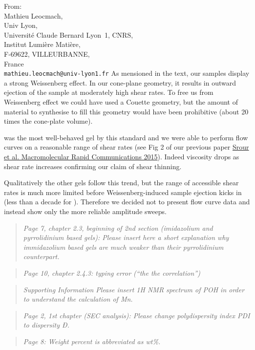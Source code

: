 \documentclass[a4paper, parskip=true, firsthead=false, fromemail=true, foldmarks=false]{scrlttr2}
\newenvironment{quotationi}
{\begin{quotation}\itshape}
{\end{quotation}}
\begin{document}
\begin{letter}{From:\\
Mathieu Leocmach,\\
Univ Lyon,\\ 
Universit\'e Claude Bernard Lyon~1, CNRS,\\
Institut Lumi\`ere Mati\`ere,\\
F-69622, VILLEURBANNE,\\
France\\
\texttt{mathieu.leocmach@univ-lyon1.fr}
}
As mensioned in the text, our samples display a strong Weissenberg effect. In our cone-plane geometry, it results in outward ejection of the sample at moderately high shear rates. To free us from Weissenberg effect we could have used a Couette geometry, but the amount of material to synthesise to fill this geometry would have been prohibitive (about 20 times the cone-plate volume).

 was the most well-behaved gel by this standard and we were able to perform flow curves on a reasonable range of shear rates (see Fig 2 of our previous paper \href{http://doi.org/10.1002/marc.201400478}{Srour et al. Macromolecular Rapid Communications 2015}). Indeed viscosity drops as shear rate increases confirming our claim of shear thinning.

Qualitatively the other gels follow this trend, but the range of accessible shear rates is much more limited before Weissenberg-induced sample ejection kicks in (less than a decade for ). Therefore we decided not to present flow curve data and instead show only the more reliable amplitude sweeps.



\begin{quotationi}
Page 7, chapter 2.3, beginning of 2nd section (imidazolium and pyrrolidinium based gels): Please insert here a short explanation why immidazolium based gels are much weaker than their pyrrolidinium counterpart.
\end{quotationi}

\begin{quotationi}
Page 10, chapter 2.4.3: typing error (“the the correlation”)
\end{quotationi}

\begin{quotationi}
Supporting Information
Please insert 1H NMR spectrum of POH in order to understand the calculation of Mn.
\end{quotationi}

\begin{quotationi}
Page 2, 1st chapter (SEC analysis): Please change polydispersity index PDI to dispersity Ð.
\end{quotationi}

\begin{quotationi}
Page 8: Weight percent is abbreviated as wt\%.
\end{quotationi}






\end{letter}
\end{document}
